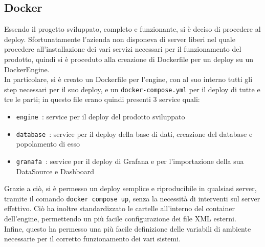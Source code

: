 		\subsection{Docker}
			Essendo il progetto sviluppato, completo e funzionante, si è deciso di procedere al deploy. Sfortunatamente l'azienda non disponeva di server liberi nel quale procedere all'installazione dei vari servizi necessari per il funzionamento del prodotto, quindi si è proceduto alla creazione di Dockerfile per un deploy su un DockerEngine.\\
			In particolare, si è creato un Dockerfile per l'engine, con al suo interno tutti gli step necessari per il suo deploy, e un \texttt{docker-compose.yml} per il deploy di tutte e tre le parti; in questo file erano quindi presenti 3 service quali:
			\begin{itemize}
					\item \texttt{engine }: service per il deploy del prodotto sviluppato
					\item \texttt{database }: service per il deploy della base di dati, creazione del database e popolamento di esso
					\item \texttt{granafa }:  service per il deploy di Grafana e per l'importazione della sua DataSource e Dashboard
			\end{itemize}
			Grazie a ciò, si è permesso un deploy semplice e riproducibile in qualsiasi server, tramite il comando \texttt{docker compose up}, senza la necessità di interventi sul server effettivo. Ciò ha inoltre standardizzato le cartelle all'interno del container dell'engine, permettendo un più facile configurazione dei file XML esterni.\\
			Infine, questo ha permesso una più facile definizione delle variabili di ambiente necessarie per il corretto funzionamento dei vari sistemi.
			

